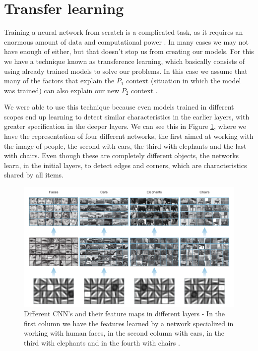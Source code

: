\section{Transfer learning} \label{transferlearning}
Training a neural network from scratch is a complicated task, as it requires an enormous amount of data and computational power \cite{elgendy2020}. In many cases we may not have enough of either, but that doesn't stop us from creating our models. For this we have a technique known as transference learning, which basically consists of using already trained models to solve our problems. In this case we assume that many of the factors that explain the $P_1$ context (situation in which the model was trained) can also explain our new $P_2$ context \cite{goodfellow2016}.

We were able to use this technique because even models trained in different scopes end up learning to detect similar characteristics in the earlier layers, with greater specification in the deeper layers. We can see this in Figure \ref{fig:figure139}, where we have the representation of four different networks, the first aimed at working with the image of people, the second with cars, the third with elephants and the last with chairs. Even though these are completely different objects, the networks learn, in the initial layers, to detect edges and corners, which are characteristics shared by all items.

\begin{figure}
    \centering
    \includegraphics[scale=0.4]{images/figure139.png}
    \caption{Different CNN's and their feature maps in different layers - In the first column we have the features learned by a network specialized in working with human faces, in the second column with cars, in the third with elephants and in the fourth with chairs \cite{elgendy2020}.}
    \label{fig:figure139}
\end{figure}


